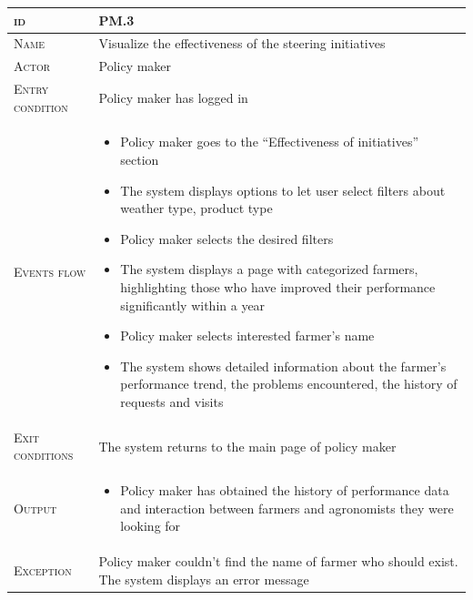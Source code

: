 \begin{table}[H]
    \centering
    \begin{tabular}{|l|p{}|}
        \hline %
    	\textsc{id}                 &   PM.3\\
    	\hline %
    	\textsc{Name}               &   Visualize the effectiveness of the steering initiatives\\
    	\hline %
    	\textsc{Actor}             &   Policy maker\\
    	\hline %
    	\textsc{Entry condition}   &   Policy maker has logged in\\
    	\hline %
    	\textsc{Events flow}         &   %
            	                        \begin{itemize}
                                    	    \item Policy maker goes to the “Effectiveness of initiatives” section
                                    	    \item The system displays options to let user select filters about weather type, product type
                                    		\item Policy maker selects the desired filters
                                    		\item The system displays a page with categorized farmers, highlighting those who have improved their performance significantly within a year
                                    		\item Policy maker selects interested farmer’s name
                                    		\item The system shows detailed information about the farmer’s performance trend, the problems encountered, the history of requests and visits
                                        \end{itemize}\\
        \hline %
        \textsc{Exit conditions}    &  The system returns to the main page of policy maker\\
    	\hline %
    	\textsc{Output}             &  \begin{itemize}
    	    \item Policy maker has obtained the history of performance data and interaction between farmers and agronomists they were looking for
    	\end{itemize}\\
    	\hline %
    	\textsc{Exception}         &  Policy maker couldn’t find the name of farmer who should exist. The system displays an error message\\
    	\hline %
        

\end{tabular}
\end{table}
